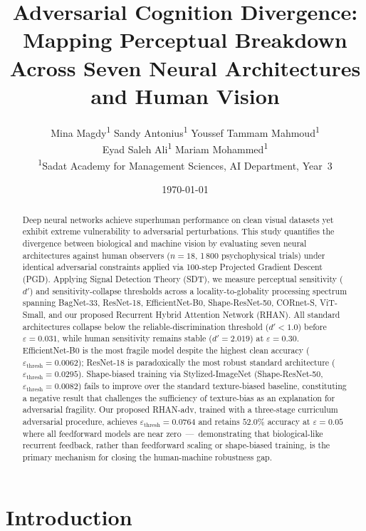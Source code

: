 \documentclass[12pt,a4paper]{article}
\title{\textbf{Adversarial Cognition Divergence: Mapping Perceptual Breakdown\\
Across Seven Neural Architectures and Human Vision}}
\author{
    Mina Magdy\textsuperscript{1} \quad
    Sandy Antonius\textsuperscript{1} \quad
    Youssef Tammam Mahmoud\textsuperscript{1} \\[4pt]
    Eyad Saleh Ali\textsuperscript{1} \quad
    Mariam Mohammed\textsuperscript{1} \\[8pt]
    \small\textsuperscript{1}Sadat Academy for Management Sciences,
    AI Department, Year~3
}
\date{\small\today}
\begin{document}
\maketitle
\thispagestyle{empty}

\begin{abstract}
Deep neural networks achieve superhuman performance on clean visual datasets
yet exhibit extreme vulnerability to adversarial perturbations.
This study quantifies the divergence between biological and machine vision
by evaluating seven neural architectures against human observers
($n{=}18$, 1\,800 psychophysical trials) under identical adversarial
constraints applied via 100-step Projected Gradient Descent (PGD).
Applying Signal Detection Theory (SDT), we measure perceptual sensitivity
($d'$) and sensitivity-collapse thresholds across a locality-to-globality
processing spectrum spanning BagNet-33, ResNet-18, EfficientNet-B0,
Shape-ResNet-50, CORnet-S, ViT-Small, and our proposed
Recurrent Hybrid Attention Network (RHAN).
All standard architectures collapse below the reliable-discrimination
threshold ($d'{<}1.0$) before $\varepsilon{=}0.031$,
while human sensitivity remains stable ($d'{=}2.019$) at $\varepsilon{=}0.30$.
EfficientNet-B0 is the most fragile model despite the highest clean accuracy
($\varepsilon_{\text{thresh}}{=}0.0062$);
ResNet-18 is paradoxically the most robust standard architecture
($\varepsilon_{\text{thresh}}{=}0.0295$).
Shape-biased training via Stylized-ImageNet
(Shape-ResNet-50, $\varepsilon_{\text{thresh}}{=}0.0082$)
fails to improve over the standard texture-biased baseline,
constituting a negative result that challenges the sufficiency of
texture-bias as an explanation for adversarial fragility.
Our proposed RHAN-adv, trained with a three-stage curriculum adversarial
procedure, achieves $\varepsilon_{\text{thresh}}{=}0.0764$ and retains
$52.0\%$ accuracy at $\varepsilon{=}0.05$ where all feedforward models
are near zero~---~demonstrating that biological-like recurrent feedback,
rather than feedforward scaling or shape-biased training, is the primary
mechanism for closing the human-machine robustness gap.
\end{abstract}

\newpage
\tableofcontents
\newpage

\section{Introduction}
\label{sec:intro}
\end{document}
